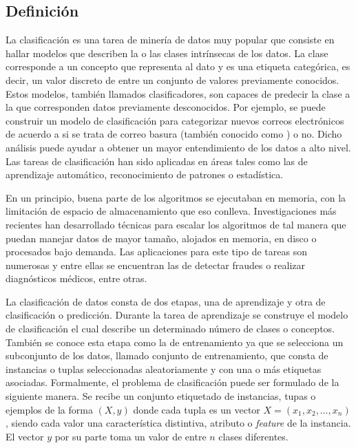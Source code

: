 \subsection{Definición}
\label{clasificacion}

La clasificación es una tarea de minería de datos muy popular que consiste en
hallar modelos que describen la o las clases intrínsecas de los datos. La clase
corresponde a un concepto que representa al dato y es una etiqueta categórica,
es decir, un valor discreto de entre un conjunto de valores previamente
conocidos. Estos modelos, también llamados clasificadores, son capaces de
predecir la clase a la que corresponden datos previamente desconocidos. Por
ejemplo, se puede construir un modelo de clasificación para categorizar nuevos
correos electrónicos  de acuerdo a si se trata de correo basura (también
conocido como ) o no. Dicho análisis puede ayudar a
obtener un mayor entendimiento de los datos a alto nivel. Las tareas de
clasificación han sido aplicadas en áreas tales como las de aprendizaje
automático, reconocimiento de patrones o estadística. 

En un principio, buena parte de los algoritmos se ejecutaban en memoria, con la
limitación de espacio de almacenamiento que eso conlleva. Investigaciones más
recientes han desarrollado técnicas para escalar los algoritmos de tal manera
que puedan manejar datos de mayor tamaño, alojados en memoria, en disco o
procesados bajo demanda. Las aplicaciones para este tipo de tareas son numerosas
y entre ellas se encuentran las de detectar fraudes o realizar diagnósticos
médicos, entre otras.

La clasificación de datos consta de dos etapas, una de aprendizaje y otra de
clasificación o predicción. Durante la tarea de aprendizaje se construye el
modelo de clasificación  el cual describe un determinado número de clases o
conceptos. También se conoce esta etapa como la de entrenamiento ya que se
selecciona un subconjunto de los datos, llamado conjunto de entrenamiento, que
consta de instancias o tuplas seleccionadas aleatoriamente y con una o más
etiquetas asociadas. Formalmente, el problema de clasificación puede ser
formulado de la siguiente manera. Se recibe un conjunto etiquetado de
instancias, tupas o ejemplos de la forma $( X, y )$ donde cada tupla es un
vector $X=(x_{1},x_{2},\dots,x_{n})$, siendo cada valor una característica
distintiva, atributo o \textit{feature} de la instancia. El vector $y$ por su
parte toma un valor de entre $n$ clases diferentes.

